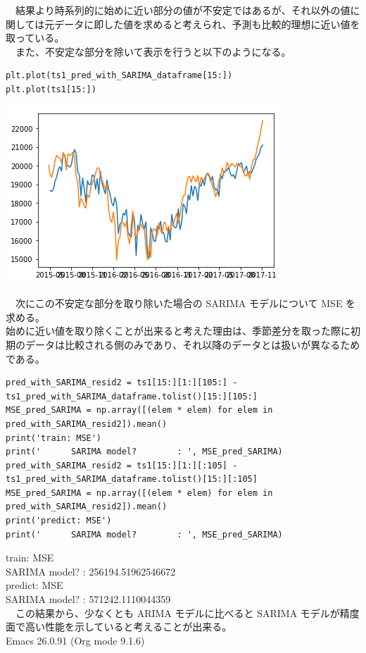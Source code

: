 \documentclass{scrartcl}
\begin{document}
　結果より時系列的に始めに近い部分の値が不安定ではあるが、それ以外の値に関しては元データに即した値を求めると考えられ、予測も比較的理想に近い値を取っている。\\
　また、不安定な部分を除いて表示を行うと以下のようになる。\\
\begin{verbatim}
plt.plot(ts1_pred_with_SARIMA_dataframe[15:])
plt.plot(ts1[15:])
\end{verbatim}

\begin{center}
\includegraphics[width=.9\linewidth]{./obipy-resources/fFVOJA.png}
\end{center}

　次にこの不安定な部分を取り除いた場合の SARIMA モデルについて MSE を求める。\\
始めに近い値を取り除くことが出来ると考えた理由は、季節差分を取った際に初期のデータは比較される側のみであり、それ以降のデータとは扱いが異なるためである。\\

\begin{verbatim}
pred_with_SARIMA_resid2 = ts1[15:][1:][105:] - ts1_pred_with_SARIMA_dataframe.tolist()[15:][105:]
MSE_pred_SARIMA = np.array([(elem * elem) for elem in pred_with_SARIMA_resid2]).mean()
print('train: MSE')
print('      SARIMA model?        : ', MSE_pred_SARIMA)
pred_with_SARIMA_resid2 = ts1[15:][1:][:105] - ts1_pred_with_SARIMA_dataframe.tolist()[15:][:105]
MSE_pred_SARIMA = np.array([(elem * elem) for elem in pred_with_SARIMA_resid2]).mean()
print('predict: MSE')
print('      SARIMA model?        : ', MSE_pred_SARIMA)
\end{verbatim}

train: MSE\\
      SARIMA model?        :  256194.51962546672\\
predict: MSE\\
      SARIMA model?        :  571242.1110044359\\

　この結果から、少なくとも ARIMA モデルに比べると SARIMA モデルが精度面で高い性能を示していると考えることが出来る。\\
\printbibliography
Emacs 26.0.91 (Org mode 9.1.6)
\end{document}
